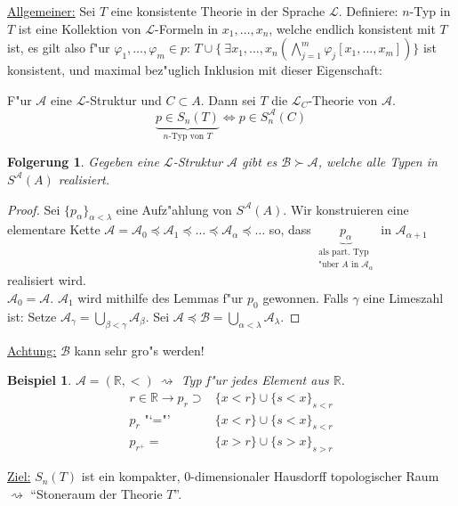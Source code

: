 \documentclass[a4paper,12pt,numbers=noenddot,parskip=full]{scrartcl}
\newcommand{\setR}{\mathbb{R}}
\newcommand{\Exists}{~\exists}
\newcommand{\scrL}{\mathcal{L}}
\newcommand{\scrA}{\mathcal{A}}
\newcommand{\scrB}{\mathcal{B}}
\newcommand{\heading}{\underline}
\theoremstyle{dotless}
\newtheorem{corollary}[theorem]{Folgerung}
\newtheorem{example}[theorem]{Beispiel}
\begin{document}
\heading{Allgemeiner:} Sei $T$ eine konsistente Theorie in der Sprache $\scrL$. Definiere: $n$-Typ in $T$ ist eine Kollektion von $\scrL$-Formeln in $x_1, \dots, x_n$, welche endlich konsistent mit $T$ ist, es gilt also f"ur $\varphi_1, \dots, \varphi_m \in p$: $T \cup \{\Exists x_1, \dots, x_n (\bigwedge\limits_{j=1}^m \varphi_j [x_1, \dots, x_m]) \}$ ist konsistent, und maximal bez"uglich Inklusion mit dieser Eigenschaft:

F"ur $\scrA$ eine $\scrL$-Struktur und $C \subset A$. Dann sei $T$ die $\scrL_C$-Theorie von $\scrA$. \begin{equation*}
	\underbrace{p \in S_n (T)}_{n \text{-Typ von }T} \Leftrightarrow p \in S_n^\scrA (C)
\end{equation*}

\begin{corollary}
	Gegeben eine $\scrL$-Struktur $\scrA$ gibt es $\scrB \succ \scrA$, welche alle Typen in $S^\scrA (A)$ realisiert.
\end{corollary}
\begin{proof}
	Sei $\{p_\alpha\}_{\alpha < \lambda}$ eine Aufz"ahlung von $S^\scrA (A)$. Wir konstruieren eine elementare Kette $\scrA = \scrA_0 \preceq \scrA_1 \preceq \dots \preceq \scrA_\alpha \preceq \dots$ so, dass $\underbrace{p_\alpha}_{\substack{\text{als part. Typ}\\ \text{"uber } A \text{ in } \scrA_\alpha}}$ in $\scrA_{\alpha+1}$ realisiert wird.\\
	$\scrA_0 = \scrA$. $\scrA_1$ wird mithilfe des Lemmas f"ur $p_0$ gewonnen. Falls $\gamma$ eine Limeszahl ist: Setze $\scrA_\gamma = \bigcup\limits_{\beta<\gamma} \scrA_\beta$. Sei $\scrA \preceq \scrB = \bigcup\limits_{\alpha<\lambda} \scrA_\lambda$.
\end{proof}

\heading{Achtung:} $\scrB$ kann sehr gro"s werden!
\begin{example}
	$\scrA = (\setR, <) ~\rightsquigarrow$ Typ f"ur jedes Element aus $\setR$.
	\begin{align*}
		r \in \setR \longrightarrow p_r \supset &\{x<r \} \cup \{s < x \}_{s<r}\\
		p_r \text{ "`="' } &\{x<r \} \cup \{s < x \}_{s<r}\\
		p_{r^+} = &\{x> r\} \cup \{s>x \}_{s>r}
	\end{align*}
\end{example}

\heading{Ziel:} $S_n (T)$ ist ein kompakter, $0$-dimensionaler Hausdorff topologischer Raum $\rightsquigarrow$ "`Stoneraum der Theorie $T$"'.
\newpage
\end{document}
